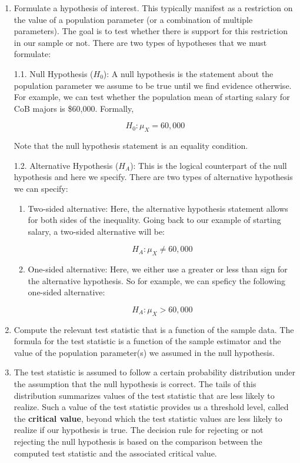 \documentclass[
]{book}
\theoremstyle{definition}
\theoremstyle{definition}
\theoremstyle{definition}
\theoremstyle{definition}
\theoremstyle{remark}
\begin{document}
\begin{enumerate}
\def\labelenumi{\arabic{enumi}.}
\item
  Formulate a hypothesis of interest. This typically manifest as a restriction on the value of a population parameter (or a combination of multiple parameters). The goal is to test whether there is support for this restriction in our sample or not. There are two types of hypotheses that we must formulate:

  1.1. Null Hypothesis (\(H_0\)): A null hypothesis is the statement about the population parameter we assume to be true until we find evidence otherwise. For example, we can test whether the population mean of starting salary for CoB majors is \$60,000. Formally,

  \[H_0: \mu_X = 60,000\]

  Note that the null hypothesis statement is an equality condition.

  1.2. Alternative Hypothesis (\(H_A\)): This is the logical counterpart of the null hypothesis and here we specify. There are two types of alternative hypothesis we can specify:

  \begin{enumerate}
  \def\labelenumii{\alph{enumii}.}
  \item
    Two-sided alternative: Here, the alternative hypothesis statement allows for both sides of the inequality. Going back to our example of starting salary, a two-sided alternative will be:

    \[H_A: \mu_X \neq 60,000\]
  \item
    One-sided alternative: Here, we either use a greater or less than sign for the alternative hypothesis. So for example, we can speficy the following one-sided alternative:

    \[H_A: \mu_X > 60,000\]
  \end{enumerate}
\item
  Compute the relevant test statistic that is a function of the sample data. The formula for the test statistic is a function of the sample estimator and the value of the population parameter(s) we assumed in the null hypothesis.
\item
  The test statistic is assumed to follow a certain probability distribution under the assumption that the null hypothesis is correct. The tails of this distribution summarizes values of the test statistic that are less likely to realize. Such a value of the test statistic provides us a threshold level, called the \textbf{critical value}, beyond which the test statistic values are less likely to realize if our hypothesis is true. The decision rule for rejecting or not rejecting the null hypothesis is based on the comparison between the computed test statistic and the associated critical value.
\end{enumerate}
\end{document}
